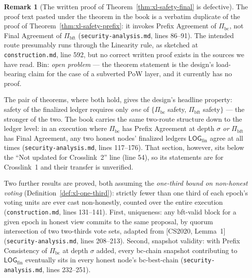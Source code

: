 \documentclass[11pt,a4paper]{article}
\theoremstyle{definition}
\newtheorem{remark}[theorem]{Remark}
\begin{document}
\begin{remark}[The written proof of Theorem~\ref{thm:xl-safety-final} is
defective]\label{rem:xl-final-agreement-proof}
The proof text pasted under the theorem in the book is a verbatim
duplicate of the proof of Theorem~\ref{thm:xl-safety-prefix}: it invokes
Prefix Agreement of $\Pi_{\mathrm{bc}}$, not Final Agreement of
$\Pi_{\mathrm{bft}}$ (\texttt{security-analysis.md}, lines 86--91). The
intended route presumably runs through the Linearity rule, as sketched at
\texttt{construction.md}, line 592, but no correct written proof exists in
the sources we have read. Bin: \emph{open problem} --- the theorem
statement is the design's load-bearing claim for the case of a subverted
PoW layer, and it currently has no proof.
\end{remark}

The pair of theorems, where both hold, gives the design's headline
property: safety of the finalized ledger requires only \emph{one} of
$\{\Pi_{\mathrm{bc}}$ safety, $\Pi_{\mathrm{bft}}$ safety$\}$ --- the
stronger of the two. The book carries the same two-route structure down to
the ledger level: in an execution where $\Pi_{\mathrm{bc}}$ has Prefix
Agreement at depth $\sigma$ \emph{or} $\Pi_{\mathrm{bft}}$ has Final
Agreement, any two honest nodes' finalized ledgers
$\mathsf{LOG}_{\mathrm{fin}}$ agree at all times
(\texttt{security-analysis.md}, lines 117--176). That section, however,
sits below the ``Not updated for Crosslink~2'' line (line 54), so its
statements are for Crosslink~1 and their transfer is unverified.

Two further results are proved, both assuming the \emph{one-third bound
on non-honest voting} (Definition~\ref{def:xl-one-third}): strictly
fewer than one third of each epoch's voting
units are ever cast non-honestly, counted over the entire execution
(\texttt{construction.md}, lines 131--141). First, uniqueness: any
bft-valid block for a given epoch in honest view commits to the same
proposal, by quorum intersection of two two-thirds vote sets, adapted from
[CS2020, Lemma~1] (\texttt{security-analysis.md}, lines 208--213). Second,
snapshot validity: with Prefix Consistency of $\Pi_{\mathrm{bc}}$ at depth
$\sigma$ added, every bc-chain snapshot contributing to
$\mathsf{LOG}_{\mathrm{fin}}$ eventually sits in every honest node's
bc-best-chain (\texttt{security-analysis.md}, lines 232--251).
\end{document}
